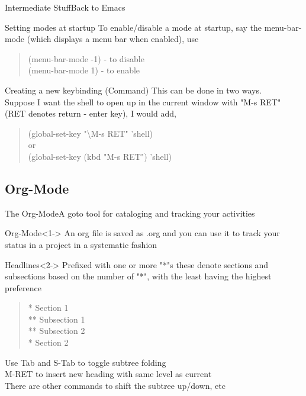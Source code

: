 \documentclass{beamer}
\begin{document}
\begin{frame}{Intermediate Stuff}{Back to Emacs}
\begin{block}{Setting modes at startup}
To enable/disable a mode at startup, say the menu-bar-mode (which displays a menu bar when enabled), use
\begin{quote}
(menu-bar-mode -1) - to disable\\
(menu-bar-mode 1) - to enable
\end{quote}
\end{block}
\begin{block}{Creating a new keybinding (Command)}
This can be done in two ways.\\
Suppose I want the shell to open up in the current window with "M-s RET" (RET denotes return - enter key), I would add,
\begin{quote}
(global-set-key "\textbackslash M-s RET" 'shell)\\
or\\
(global-set-key (kbd "M-s RET") 'shell)
\end{quote}
\end{block}
\end{frame}

\subsection{Org-Mode}
\begin{frame}{The Org-Mode}{A goto tool for cataloging and tracking your activities}
\begin{block}{Org-Mode}<1->
An org file is saved as .org and you can use it to track your status in a project in a systematic fashion
\end{block}
\begin{block}{Headlines}<2->
Prefixed with one or more "*"s these denote sections and subsections based on the number of "*", with the least having the highest preference
\begin{quote}
* Section 1\\
** Subsection 1\\
** Subsection 2\\
* Section 2\\
\end{quote}
Use Tab and S-Tab to toggle subtree folding\\
M-RET to insert new heading with same level as current\\
There are other commands to shift the subtree up/down, etc
\end{block}
\end{frame}
\end{document}
